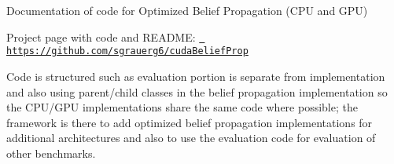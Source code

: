 \label{index_md_src_main}%
%
 Documentation of code for Optimized Belief Propagation (CPU and GPU)

Project page with code and README\+: \href{https://github.com/sgrauerg6/cudaBeliefProp}{\texttt{ https\+://github.\+com/sgrauerg6/cuda\+Belief\+Prop}}

Code is structured such as evaluation portion is separate from implementation and also using parent/child classes in the belief propagation implementation so the CPU/\+GPU implementations share the same code where possible; the framework is there to add optimized belief propagation implementations for additional architectures and also to use the evaluation code for evaluation of other benchmarks. 